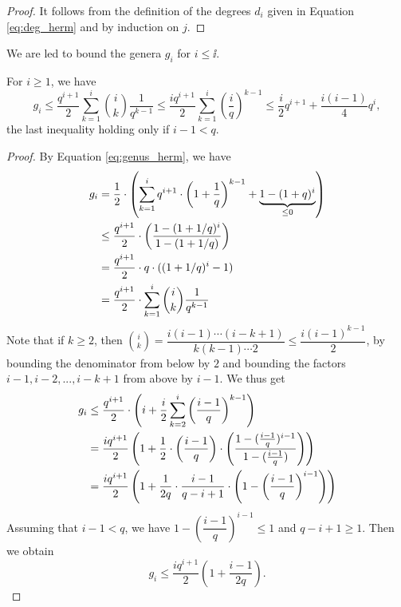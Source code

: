 \documentclass[10pt]{article}
\begin{document}
\begin{proof}
It follows from the definition of the degrees $d_i$ given in Equation \eqref{eq:deg_herm} and by induction on $j$.
\end{proof}

We are led to bound the genera $g_i$ for $i \leq \ii$. 

\begin{proposition}\label{prop:maj_genus_herm}
For $i \geq 1$, we have
\[g_i \leq \dfrac{q^{i+1}}{2} \sum\limits_{k=1}^i \binom{i}{k} \dfrac{1}{q^{k-1}} \leq \dfrac{iq^{i+1}}{2} \sum\limits_{k=1}^i \left(\dfrac{i}{q}\right)^{k-1} \leq \dfrac{i}{2}q^{i+1} + \dfrac{i(i-1)}{4}q^i,\]
the last inequality holding only if $i-1 < q$.
\end{proposition}

\begin{proof}
By Equation  \eqref{eq:genus_herm}, we have
\begin{align*}
g_i  &=\dfrac{1}{2} \cdot \left(\sum\limits_{k=1}^i q^{i+1} \cdot \left(1+\frac{1}{q}\right)^{k-1} +\underbrace{1 -(1+q)^i}_{\leq 0}\right) \\
	&\leq \dfrac{q^{i+1}}{2} \cdot \left(\dfrac{1-(1+1/q)^i}{1-(1+1/q)}\right) \\
	& = \dfrac{q^{i+1}}{2} \cdot q \cdot ((1+1/q)^i-1) \\
	& = \dfrac{q^{i+1}}{2} \cdot \sum\limits_{k=1}^i \binom{i}{k} \dfrac{1}{q^{k-1}}
\end{align*}
Note that if $k \geq 2$, then $\binom{i}{k} = \dfrac{i(i-1) \cdots (i-k+1)}{k(k-1) \cdots 2} \leq \dfrac{i(i-1)^{k-1}}{2}$, by bounding the denominator from below by $2$ and bounding the factors $i-1,i-2,...,i-k+1$ from above by $i-1$. We thus get
\begin{align*}
g_i &\leq \dfrac{q^{i+1}}{2} \cdot \left( i + \frac{i}{2} \sum\limits_{k=2}^i \left(\dfrac{i-1}{q}\right)^{k-1}\right) \\
	&= \dfrac{iq^{i+1}}{2} \left( 1 + \frac{1}{2} \cdot \left(\frac{i-1}{q}\right) \cdot \left(\dfrac{1-(\frac{i-1}{q})^{i-1}}{1-(\frac{i-1}{q})}\right)\right) \\
		&= \dfrac{iq^{i+1}}{2} \left( 1 + \frac{1}{2q} \cdot \dfrac{i-1}{q-i+1} \cdot \left(1- \left(\dfrac{i-1}{q}\right)^{i-1}\right)\right)\end{align*}
Assuming that $i-1 < q$, we have $1- \left(\dfrac{i-1}{q}\right)^{i-1} \leq 1$ and $q-i+1 \geq 1$. Then we obtain 	
	\[g_i \leq \dfrac{iq^{i+1}}{2} \left( 1 + \frac{i-1}{2q}\right).\]
\end{proof}
\end{document}

